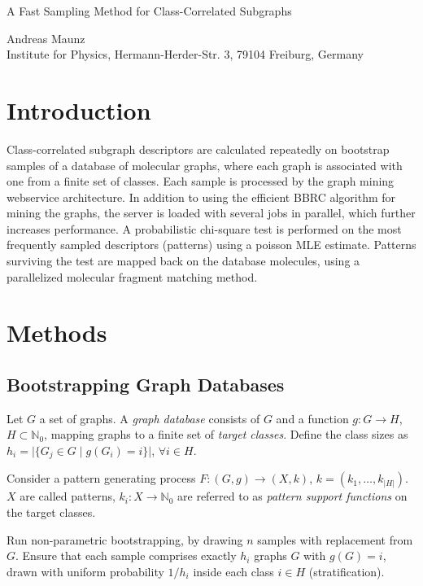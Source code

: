 \documentclass{article}
\begin{document}
\begin{center}
\begin{huge}A Fast Sampling Method for Class-Correlated Subgraphs\end{huge}

Andreas Maunz \\Institute for Physics, Hermann-Herder-Str. 3, 79104 Freiburg, Germany
\end{center}

\section{Introduction}
Class-correlated subgraph descriptors are calculated repeatedly on bootstrap samples of a database of molecular graphs, where each graph is associated with one from a finite set of classes.
Each sample is processed by the graph mining webservice architecture. In addition to using the efficient BBRC algorithm for mining the graphs, the server is loaded with several jobs in parallel, which further increases performance.
A probabilistic chi-square test is performed on the most frequently sampled descriptors (patterns) using a poisson MLE estimate.
Patterns surviving the test are mapped back on the database molecules, using a parallelized molecular fragment matching method.

\section{Methods}
\subsection{Bootstrapping Graph Databases}
Let $G$ a set of graphs. A \emph{graph database} consists of $G$ and a function $g: G \rightarrow H$, $H \subset \mathbb{N}_0$, mapping graphs to a finite set of \emph{target classes}. Define the class sizes as $h_i=\vert\{G_j \in G \; \vert\; g(G_i)=i\}\vert$, $\forall i \in H$.

Consider a pattern generating process $F: (G,g) \rightarrow (X,k)$, $k=\left(k_1,\ldots,k_{\vert H\vert}\right)$. $X$ are called patterns, $k_i: X \rightarrow \mathbb{N}_0$ are referred to as \emph{pattern support functions} on the target classes.

Run non-parametric bootstrapping, by drawing $n$ samples with replacement from $G$. Ensure that each sample comprises exactly $h_i$ graphs $G$ with $g(G)=i$, drawn with uniform probability $1/h_i$ inside each class $i \in H$ (stratification).
\end{document}
